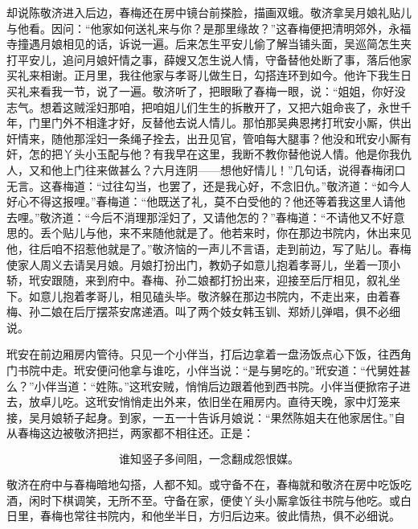 却说陈敬济进入后边，春梅还在房中镜台前搽脸，描画双蛾。敬济拿吴月娘礼贴儿与他看。因问：“他家如何送礼来与你？是那里缘故？”这春梅便把清明郊外，永福寺撞遇月娘相见的话，诉说一遍。后来怎生平安儿偷了解当铺头面，吴巡简怎生夹打平安儿，追问月娘奸情之事，薛嫂又怎生说人情，守备替他处断了事，落后他家买礼来相谢。正月里，我往他家与孝哥儿做生日，勾搭连环到如今。他许下我生日买礼来看我一节，说了一遍。敬济听了，把眼瞅了春梅一眼，说：“姐姐，你好没志气。想着这贼淫妇那咱，把咱姐儿们生生的拆散开了，又把六姐命丧了，永世千年，门里门外不相逢才好，反替他去说人情儿。那怕那吴典恩拷打玳安小厮，供出奸情来，随他那淫妇一条绳子拴去，出丑见官，管咱每大腿事？他没和玳安小厮有奸，怎的把丫头小玉配与他？有我早在这里，我断不教你替他说人情。他是你我仇人，又和他上门往来做甚么？六月连阴——想他好情儿！”几句话，说得春梅闭口无言。这春梅道：“过往勾当，也罢了，还是我心好，不念旧仇。”敬济道：“如今人好心不得这报哩。”春梅道：“他既送了礼，莫不白受他的？他还等着我这里人请他去哩。”敬济道：“今后不消理那淫妇了，又请他怎的？”春梅道：“不请他又不好意思的。丢个贴儿与他，来不来随他就是了。他若来时，你在那边书院内，休出来见他，往后咱不招惹他就是了。”敬济恼的一声儿不言语，走到前边，写了贴儿。春梅使家人周义去请吴月娘。月娘打扮出门，教奶子如意儿抱着孝哥儿，坐着一顶小轿，玳安跟随，来到府中。春梅、孙二娘都打扮出来，迎接至后厅相见，叙礼坐下。如意儿抱着孝哥儿，相见磕头毕。敬济躲在那边书院内，不走出来，由着春梅、孙二娘在后厅摆茶安席递酒。叫了两个妓女韩玉钏、郑娇儿弹唱，俱不必细说。

玳安在前边厢房内管待。只见一个小伴当，打后边拿着一盘汤饭点心下饭，往西角门书院中走。玳安便问他拿与谁吃，小伴当说：“是与舅吃的。”玳安道：“代舅姓甚么？”小伴当道：“姓陈。”这玳安贼，悄悄后边跟着他到西书院。小伴当便掀帘子进去，放卓儿吃。这玳安悄悄走出外来，依旧坐在厢房内。直待天晚，家中灯笼来接，吴月娘轿子起身。到家，一五一十告诉月娘说：“果然陈姐夫在他家居住。”自从春梅这边被敬济把拦，两家都不相往还。正是：

\[
谁知竖子多间阻，一念翻成怨恨媒。
\]

敬济在府中与春梅暗地勾搭，人都不知。或守备不在，春梅就和敬济在房中吃饭吃酒，闲时下棋调笑，无所不至。守备在家，便使丫头小厮拿饭往书院与他吃。或白日里，春梅也常往书院内，和他坐半日，方归后边来。彼此情热，俱不必细说。

